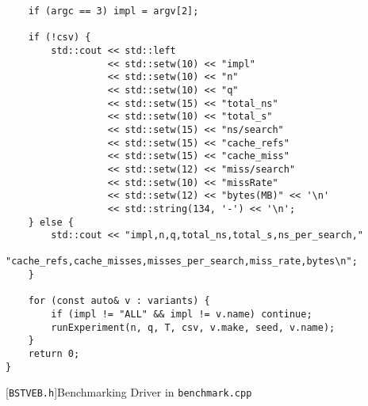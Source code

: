 \begin{lstlisting}
    if (argc == 3) impl = argv[2];

    if (!csv) {
        std::cout << std::left
                  << std::setw(10) << "impl"
                  << std::setw(10) << "n"
                  << std::setw(10) << "q"
                  << std::setw(15) << "total_ns"
                  << std::setw(10) << "total_s"
                  << std::setw(15) << "ns/search"
                  << std::setw(15) << "cache_refs"
                  << std::setw(15) << "cache_miss"
                  << std::setw(12) << "miss/search"
                  << std::setw(10) << "missRate"
                  << std::setw(12) << "bytes(MB)" << '\n'
                  << std::string(134, '-') << '\n';
    } else {
        std::cout << "impl,n,q,total_ns,total_s,ns_per_search,"
                     "cache_refs,cache_misses,misses_per_search,miss_rate,bytes\n";
    }

    for (const auto& v : variants) {
        if (impl != "ALL" && impl != v.name) continue;
        runExperiment(n, q, T, csv, v.make, seed, v.name);
    }
    return 0;
}

\end{lstlisting}
[\texttt{BSTVEB.h}]{Benchmarking Driver in \texttt{benchmark.cpp}}
\label{lst:benchcpp}

